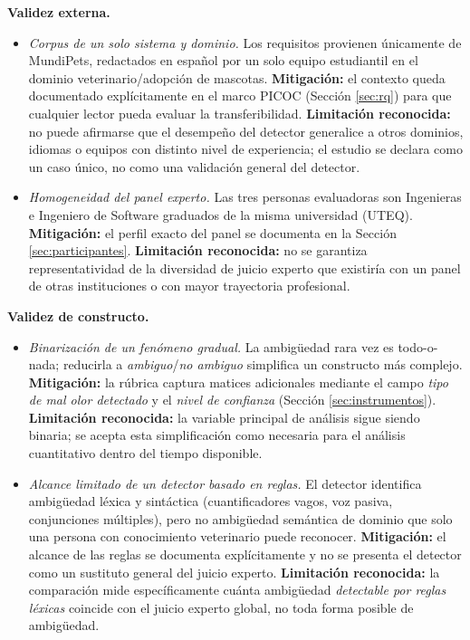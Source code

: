 \documentclass[journal,onecolumn]{IEEEtran}
\begin{document}
\textbf{Validez externa.}
\begin{itemize}[leftmargin=*]
	\item \emph{Corpus de un solo sistema y dominio.} Los requisitos
	provienen únicamente de MundiPets, redactados en español por un solo
	equipo estudiantil en el dominio veterinario/adopción de mascotas.
	\textbf{Mitigación:} el contexto queda documentado explícitamente en
	el marco PICOC (Sección \ref{sec:rq}) para que cualquier lector pueda
	evaluar la transferibilidad. \textbf{Limitación reconocida:} no puede
	afirmarse que el desempeño del detector generalice a otros dominios,
	idiomas o equipos con distinto nivel de experiencia; el estudio se
	declara como un caso único, no como una validación general del
	detector.
	\item \emph{Homogeneidad del panel experto.} Las tres personas
	evaluadoras son Ingenieras e Ingeniero de Software graduados de la
	misma universidad (UTEQ). \textbf{Mitigación:} el perfil exacto del
	panel se documenta en la Sección \ref{sec:participantes}.
	\textbf{Limitación reconocida:} no se garantiza representatividad de
	la diversidad de juicio experto que existiría con un panel de otras
	instituciones o con mayor trayectoria profesional.
\end{itemize}

\textbf{Validez de constructo.}
\begin{itemize}[leftmargin=*]
	\item \emph{Binarización de un fenómeno gradual.} La ambigüedad
	rara vez es todo-o-nada; reducirla a \emph{ambiguo}/\emph{no ambiguo}
	simplifica un constructo más complejo. \textbf{Mitigación:} la
	rúbrica captura matices adicionales mediante el campo \emph{tipo de
		mal olor detectado} y el \emph{nivel de confianza} (Sección
	\ref{sec:instrumentos}). \textbf{Limitación reconocida:} la variable
	principal de análisis sigue siendo binaria; se acepta esta
	simplificación como necesaria para el análisis cuantitativo dentro
	del tiempo disponible.
	\item \emph{Alcance limitado de un detector basado en reglas.} El
	detector identifica ambigüedad léxica y sintáctica (cuantificadores
	vagos, voz pasiva, conjunciones múltiples), pero no ambigüedad
	semántica de dominio que solo una persona con conocimiento
	veterinario puede reconocer. \textbf{Mitigación:} el alcance de las
	reglas se documenta explícitamente y no se presenta el detector como
	un sustituto general del juicio experto. \textbf{Limitación
		reconocida:} la comparación mide específicamente cuánta ambigüedad
	\emph{detectable por reglas léxicas} coincide con el juicio experto
	global, no toda forma posible de ambigüedad.
\end{itemize}
\end{document}
